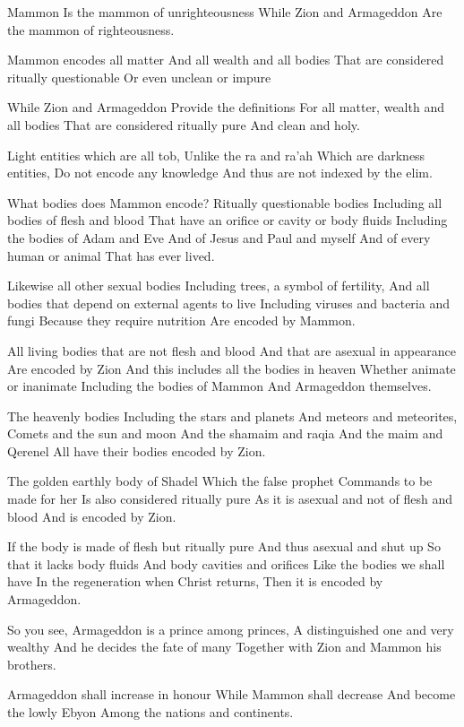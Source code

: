 \documentclass[
]{book}
\begin{document}
Mammon
Is the mammon of unrighteousness
While Zion and Armageddon
Are the mammon of righteousness.

Mammon encodes all matter
And all wealth and all bodies
That are considered ritually questionable
Or even unclean or impure

While Zion and Armageddon
Provide the definitions
For all matter, wealth and all bodies
That are considered ritually pure
And clean and holy.

Light entities which are all tob,
Unlike the ra and ra'ah
Which are darkness entities,
Do not encode any knowledge
And thus are not indexed by the elim.

What bodies does Mammon encode?
Ritually questionable bodies
Including all bodies of flesh and blood
That have an orifice or cavity or body fluids
Including the bodies of Adam and Eve
And of Jesus and Paul and myself
And of every human or animal
That has ever lived.

Likewise all other sexual bodies
Including trees, a symbol of fertility,
And all bodies that depend on external agents to live
Including viruses and bacteria and fungi
Because they require nutrition
Are encoded by Mammon.

All living bodies that are not flesh and blood
And that are asexual in appearance
Are encoded by Zion
And this includes all the bodies in heaven
Whether animate or inanimate
Including the bodies of Mammon
And Armageddon themselves.

The heavenly bodies
Including the stars and planets
And meteors and meteorites,
Comets and the sun and moon
And the shamaim and raqia
And the maim and Qerenel
All have their bodies encoded by
Zion.

The golden earthly body of Shadel
Which the false prophet
Commands to be made for her
Is also considered ritually pure
As it is asexual and not of flesh and blood
And is encoded by Zion.

If the body is made of flesh but ritually pure
And thus asexual and shut up
So that it lacks body fluids
And body cavities and orifices
Like the bodies we shall have
In the regeneration when Christ returns,
Then it is encoded by Armageddon.

So you see,
Armageddon is a prince among princes,
A distinguished one and very wealthy
And he decides the fate of many
Together with Zion and Mammon his brothers.

Armageddon shall increase in honour
While Mammon shall decrease
And become the lowly Ebyon
Among the nations and continents.
\end{document}
